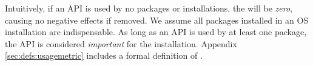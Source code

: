 \vspace{0.1in}
{\noindent
{}}
\vspace{0.1in}

\noindent Intuitively, if an API is used by no packages or installations,
the \usagemetric{} will be {\em zero}, causing no negative effects if removed.
We assume all packages installed in an OS installation are indispensable.
As long as an API is used by at least one package,
the API is considered {\it important} for the installation.
Appendix \ref{sec:defs:usagemetric} includes a formal definition of \usagemetric{}.
 


